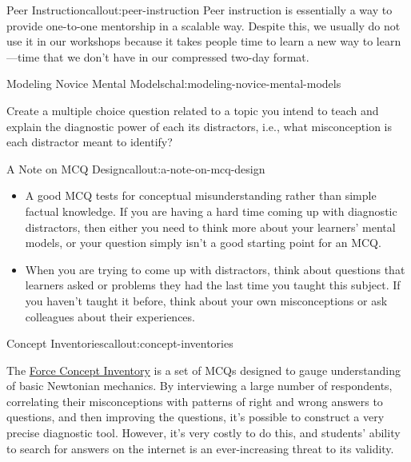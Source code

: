 \begin{callout}{Peer Instruction}{callout:peer-instruction}
Peer instruction is essentially a way to provide one-to-one mentorship
in a scalable way. Despite this, we usually do not use it in our
workshops because it takes people time to learn a new way to
learn---time that we don't have in our compressed two-day format.
\end{callout}

\begin{challenge}{Modeling Novice Mental Models}{chal:modeling-novice-mental-models}

Create a multiple choice question related to a topic you intend to teach
and explain the diagnostic power of each its distractors, i.e., what
misconception is each distractor meant to identify?
\end{challenge}

\begin{callout}{A Note on MCQ Design}{callout:a-note-on-mcq-design}

\begin{itemize}
\item
  A good MCQ tests for conceptual misunderstanding rather than simple
  factual knowledge. If you are having a hard time coming up with
  diagnostic distractors, then either you need to think more about your
  learners' mental models, or your question simply isn't a good starting
  point for an MCQ.
\item
  When you are trying to come up with distractors, think about questions
  that learners asked or problems they had the last time you taught this
  subject. If you haven't taught it before, think about your own
  misconceptions or ask colleagues about their experiences.
\end{itemize}
\end{callout}

\begin{callout}{Concept Inventories}{callout:concept-inventories}

The \href{https://en.wikipedia.org/wiki/Force\_Concept\_Inventory}{Force
Concept Inventory} is a set of MCQs designed to gauge understanding of
basic Newtonian mechanics. By interviewing a large number of
respondents, correlating their misconceptions with patterns of right and
wrong answers to questions, and then improving the questions, it's
possible to construct a very precise diagnostic tool. However, it's very
costly to do this, and students' ability to search for answers on the
internet is an ever-increasing threat to its validity.
\end{callout}

